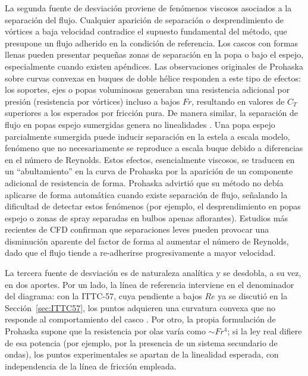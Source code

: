 La segunda fuente de desviación proviene de fenómenos viscosos asociados a la separación del flujo. Cualquier aparición de separación o desprendimiento de vórtices a baja velocidad contradice el supuesto fundamental del método, que presupone un flujo adherido en la condición de referencia. Los cascos con formas llenas pueden presentar pequeñas zonas de separación en la popa o bajo el espejo, especialmente cuando existen apéndices. Las observaciones originales de Prohaska sobre curvas convexas en buques de doble hélice responden a este tipo de efectos: los soportes, ejes o popas voluminosas generaban una resistencia adicional por presión (resistencia por vórtices) incluso a bajos $Fr$, resultando en valores de $C_T$ superiores a los esperados por fricción pura. De manera similar, la separación de flujo en popas espejo sumergidas genera no linealidades \citep{keh-sik-min, korkmaz_cfd_2021}. Una popa espejo parcialmente sumergida puede inducir separación en la estela a escala modelo, fenómeno que no necesariamente se reproduce a escala buque debido a diferencias en el número de Reynolds. Estos efectos, esencialmente viscosos, se traducen en un ``abultamiento'' en la curva de Prohaska por la aparición de un componente adicional de resistencia de forma. Prohaska advirtió que su método no debía aplicarse de forma automática cuando existe separación de flujo, señalando la dificultad de detectar estos fenómenos (por ejemplo, el desprendimiento en popas espejo o zonas de spray separadas en bulbos apenas aflorantes). Estudios más recientes de CFD \citep{korkmaz-verif-and-valid-cfd-efd} confirman que separaciones leves pueden provocar una disminución aparente del factor de forma al aumentar el número de Reynolds, dado que el flujo tiende a re-adherirse progresivamente a mayor velocidad.

La tercera fuente de desviación es de naturaleza analítica y se desdobla, a su vez, en dos aportes. Por un lado, la línea de referencia interviene en el denominador del diagrama: con la ITTC-57, cuya pendiente a bajos $Re$ ya se discutió en la Sección~\ref{sec:ITTC57}, los puntos adquieren una curvatura convexa que no responde al comportamiento del casco \citep{ITTC_Combined_2021}. Por otro, la propia formulación de Prohaska supone que la resistencia por olas varía como ${\sim}Fr^4$; si la ley real difiere de esa potencia (por ejemplo, por la presencia de un sistema secundario de ondas), los puntos experimentales se apartan de la linealidad esperada, con independencia de la línea de fricción empleada.


